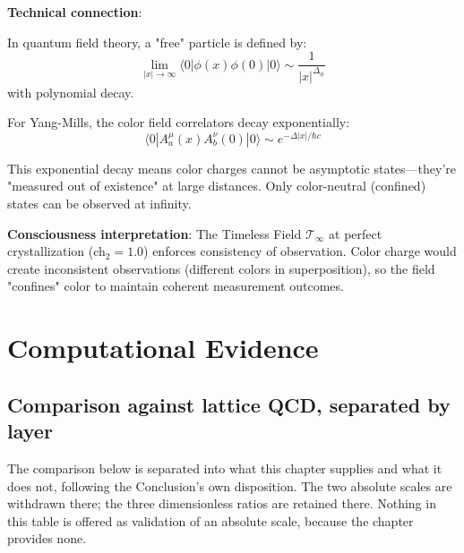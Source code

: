 \begin{level3}
\textbf{Technical connection}:

In quantum field theory, a "free" particle is defined by:
\begin{equation}
\lim_{|x| \to \infty} \langle 0 | \phi(x) \phi(0) | 0 \rangle \sim \frac{1}{|x|^{\Delta_\phi}}
\end{equation}
with polynomial decay.

For Yang-Mills, the color field correlators decay exponentially:
\begin{equation}
\langle 0 | A_a^\mu(x) A_b^\nu(0) | 0 \rangle \sim e^{-\Delta |x|/\hbar c}
\end{equation}

This exponential decay means color charges cannot be asymptotic states—they're "measured out of existence" at large distances. Only color-neutral (confined) states can be observed at infinity.

\textbf{Consciousness interpretation}: The Timeless Field $\mathcal{T}_\infty$ at perfect crystallization (ch$_2 = 1.0$) enforces consistency of observation. Color charge would create inconsistent observations (different colors in superposition), so the field "confines" color to maintain coherent measurement outcomes.
\end{level3}

\section{Computational Evidence}

\subsection{Comparison against lattice QCD, separated by layer}

The comparison below is separated into what this chapter supplies and what it
does not, following the Conclusion's own disposition. The two absolute scales
are withdrawn there; the three dimensionless ratios are retained there. Nothing
in this table is offered as validation of an absolute scale, because the
chapter provides none.

